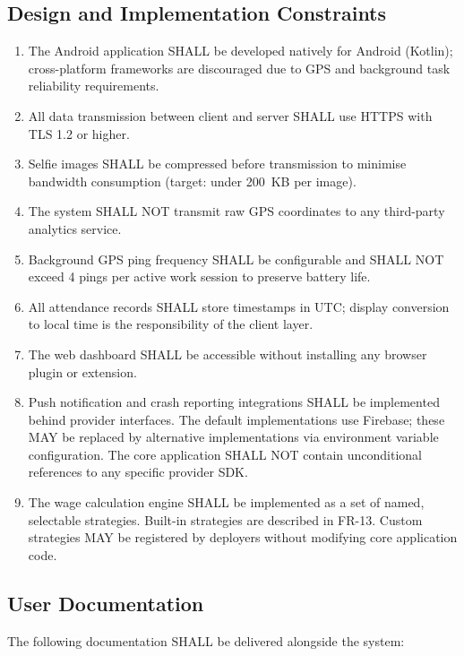 \documentclass[12pt, a4paper]{article}
\begin{document}
\subsection{Design and Implementation Constraints}
\begin{enumerate}
    \item The Android application SHALL be developed natively for Android
          (Kotlin); cross-platform frameworks are discouraged due to GPS
          and background task reliability requirements.
    \item All data transmission between client and server SHALL use HTTPS
          with TLS 1.2 or higher.
    \item Selfie images SHALL be compressed before transmission to minimise
          bandwidth consumption (target: under 200~KB per image).
    \item The system SHALL NOT transmit raw GPS coordinates to any
          third-party analytics service.
    \item Background GPS ping frequency SHALL be configurable and SHALL
          NOT exceed 4 pings per active work session to preserve battery
          life.
    \item All attendance records SHALL store timestamps in UTC; display
          conversion to local time is the responsibility of the client
          layer.
    \item The web dashboard SHALL be accessible without installing any
          browser plugin or extension.
    \item Push notification and crash reporting integrations SHALL be
          implemented behind provider interfaces. The default
          implementations use Firebase; these MAY be replaced by
          alternative implementations via environment variable
          configuration. The core application SHALL NOT contain
          unconditional references to any specific provider SDK.
    \item The wage calculation engine SHALL be implemented as a set of
          named, selectable strategies. Built-in strategies are described
          in FR-13. Custom strategies MAY be registered by deployers
          without modifying core application code.
\end{enumerate}

\subsection{User Documentation}
The following documentation SHALL be delivered alongside the system:
\end{document}
